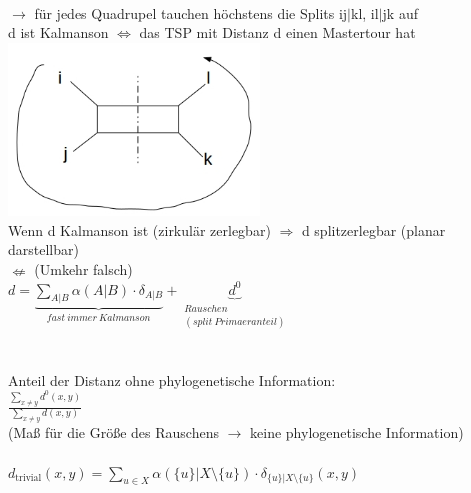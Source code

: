 \\
$\rightarrow$ für jedes Quadrupel tauchen höchstens die Splits ij$|$kl, il$|$jk auf\\
d ist Kalmanson $\Leftrightarrow$ das TSP mit Distanz d einen Mastertour hat\\
\includegraphics[width=0.5\textwidth]{lectures/161216/pix/7.jpg}\\
Wenn d Kalmanson ist (zirkulär zerlegbar) $\Rightarrow$ d splitzerlegbar (planar darstellbar)\\
$\nLeftarrow$ (Umkehr falsch)\\

$d=\underbrace{\displaystyle\sum_{A|B}\alpha(A|B) \cdot \delta_{A|B}}_{fast\ immer\ Kalmanson} + \underbrace{d^0}_{\substack{Rauschen \\ (split\ Primaeranteil)}}$\\\\\\
Anteil der Distanz ohne phylogenetische Information:\\
$\frac{\displaystyle\sum_{x\neq y} d^0(x,y)}{\displaystyle\sum_{x\neq y} d(x,y)}$\\
(Maß für die Größe des Rauschens $\rightarrow$ keine phylogenetische Information)
\\\\
$d_{\text{trivial}}(x,y)=\displaystyle \sum \limits_{u \in X} \alpha(\{u\}|X\setminus \{u\}) \cdot \delta_{\{u\}|X\setminus \{u\}}(x,y)$